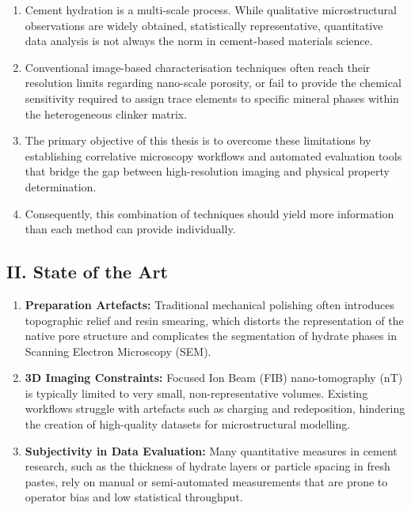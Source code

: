 \documentclass[11pt, a4paper]{article}
\begin{document}
\begin{enumerate}[label=\textbf{\arabic*.}, leftmargin=1.5cm, labelsep=0.5cm, itemsep=0.5em]
    \item Cement hydration is a multi-scale process.
    While qualitative microstructural observations are widely obtained, statistically representative, quantitative data analysis is not always the norm in cement-based materials science.
    \item Conventional image-based characterisation techniques often reach their resolution limits regarding nano-scale porosity, or fail to provide the chemical sensitivity required to assign trace elements to specific mineral phases within the heterogeneous clinker matrix.
    \item The primary objective of this thesis is to overcome these limitations by establishing correlative microscopy workflows and automated evaluation tools that bridge the gap between high-resolution imaging and physical property determination.
    \item Consequently, this combination of techniques should yield more information than each method can provide individually.
\end{enumerate}

\subsection*{II. State of the Art}

\begin{enumerate}[label=\textbf{\arabic*.}, leftmargin=1.5cm, labelsep=0.5cm, itemsep=0.5em, resume]
    \item \textbf{Preparation Artefacts:} Traditional mechanical polishing often introduces topographic relief and resin smearing, which distorts the representation of the native pore structure and complicates the segmentation of hydrate phases in Scanning Electron Microscopy (SEM).
    \item \textbf{3D Imaging Constraints:} Focused Ion Beam (FIB) nano-tomography (nT) is typically limited to very small, non-representative volumes.
    Existing workflows struggle with artefacts such as charging and redeposition, hindering the creation of high-quality datasets for microstructural modelling.
    \item \textbf{Subjectivity in Data Evaluation:} Many quantitative measures in cement research, such as the thickness of hydrate layers or particle spacing in fresh pastes, rely on manual or semi-automated measurements that are prone to operator bias and low statistical throughput.
\end{enumerate}
\end{document}
